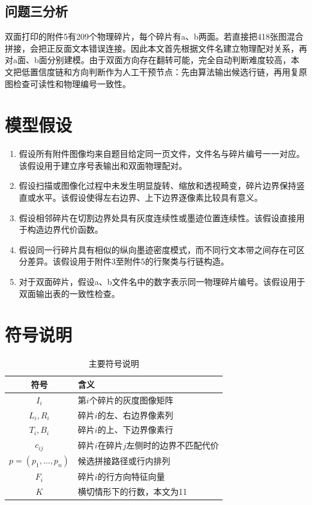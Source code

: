 \documentclass[UTF8,a4paper,12pt]{ctexart}
\begin{document}
\subsection{问题三分析}
双面打印的附件5有209个物理碎片，每个碎片有a、b两面。若直接把418张图混合拼接，会把正反面文本错误连接。因此本文首先根据文件名建立物理配对关系，再对a面、b面分别建模。由于双面方向存在翻转可能，完全自动判断难度较高，本文把低置信度链和方向判断作为人工干预节点：先由算法输出候选行链，再用复原图检查可读性和物理编号一致性。

\section{模型假设}
\begin{enumerate}
\item 假设所有附件图像均来自题目给定同一页文件，文件名与碎片编号一一对应。该假设用于建立序号表输出和双面物理配对。
\item 假设扫描或图像化过程中未发生明显旋转、缩放和透视畸变，碎片边界保持竖直或水平。该假设使得左右边界、上下边界逐像素比较具有意义。
\item 假设相邻碎片在切割边界处具有灰度连续性或墨迹位置连续性。该假设直接用于构造边界代价函数。
\item 假设同一行碎片具有相似的纵向墨迹密度模式，而不同行文本带之间存在可区分差异。该假设用于附件3至附件5的行聚类与行链构造。
\item 对于双面碎片，假设a、b文件名中的数字表示同一物理碎片编号。该假设用于双面输出表的一致性检查。
\end{enumerate}

\section{符号说明}
\begin{table}[H]\centering\caption{主要符号说明}\begin{tabular}{cl}\toprule 符号&含义\\\midrule
$I_i$&第$i$个碎片的灰度图像矩阵\\
$L_i,R_i$&碎片$i$的左、右边界像素列\\
$T_i,B_i$&碎片$i$的上、下边界像素行\\
$c_{ij}$&碎片$i$在碎片$j$左侧时的边界不匹配代价\\
$p=(p_1,\ldots,p_n)$&候选拼接路径或行内排列\\
$F_i$&碎片$i$的行方向特征向量\\
$K$&横切情形下的行数，本文为11\\
\bottomrule\end{tabular}\end{table}
\end{document}
